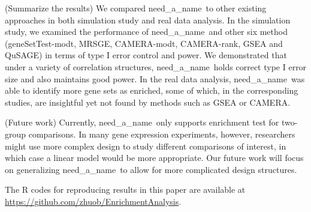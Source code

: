 \documentclass[useAMS,usenatbib, galley]{biom}
\newcommand{\OurMethod}{need\_a\_name}
\newcommand{\CMR}{CAMERA-rank}
\newcommand{\CMT}{CAMERA-modt}
\newcommand{\gent}{geneSetTest-modt}
\begin{document}
	(Summarize the results) We compared \OurMethod~to other existing approaches in both simulation study and real data analysis. In the simulation study, we examined the performance of \OurMethod~and other six method (\gent, MRSGE, \CMT, \CMR, GSEA and QuSAGE) in terms of type I error control and power. We demonstrated that under a variety of correlation structures, \OurMethod~holds correct type I error size and also maintains good power. In the real data analysis, \OurMethod~was able to identify more gene sets as enriched, some of which, in the corresponding studies, are insightful yet not found by methods such as GSEA or CAMERA.  
	
	(Future work) Currently, \OurMethod~only supports enrichment test for two-group comparisons. In many gene expression experiments, however, researchers might use more complex design to study different comparisons of interest, in which case a linear model would be more appropriate. Our future work will focus on generalizing \OurMethod~to allow for more complicated design structures. 
	
	The R codes for reproducing results in this paper are available at \url{https://github.com/zhuob/EnrichmentAnalysis}.
	
\end{document}
